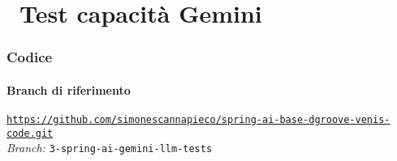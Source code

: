 \section{\faWrench\ Test capacità Gemini} %
\label{sec:spring-ai-gemini-service}
%
\begin{frame}[fragile] \frametitle{Codice}
    \framesubtitle{Branch di riferimento}
	\begin{center}
		{\scriptsize \href{https://github.com/simonescannapieco/spring-ai-base-dgroove-venis-code.git}{\texttt{https://github.com/simonescannapieco/spring-ai-base-dgroove-venis-code.git}}}\\
		\textit{Branch:} \alert{\texttt{3-spring-ai-gemini-llm-tests}}
	\end{center}
\end{frame}
